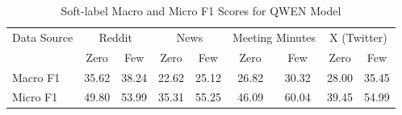 \begin{table}[htbp]
\centering
\begin{tabular}{l *{8}{c}}
\toprule
Data Source & \multicolumn{2}{c}{Reddit} & \multicolumn{2}{c}{News} & \multicolumn{2}{c}{Meeting Minutes} & \multicolumn{2}{c}{X (Twitter)} \\
& Zero & Few & Zero & Few & Zero & Few & Zero & Few \\
\midrule
Macro F1 & 35.62 & 38.24 & 22.62 & 25.12 & 26.82 & 30.32 & 28.00 & 35.45 \\
Micro F1 & 49.80 & 53.99 & 35.31 & 55.25 & 46.09 & 60.04 & 39.45 & 54.99 \\
\bottomrule
\end{tabular}
\centering\caption{Soft-label Macro and Micro F1 Scores for QWEN Model}
\label{tab:qwen_macro_micro}
\end{table}
